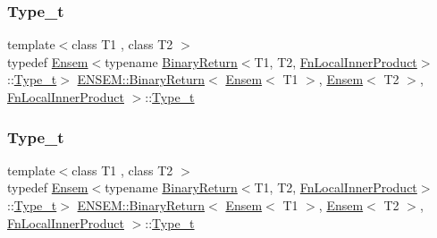 \subsubsection{\texorpdfstring{Type\_t}{Type\_t}\hspace{0.1cm}{\footnotesize\ttfamily [2/3]}}
{\footnotesize\ttfamily template$<$class T1 , class T2 $>$ \\
typedef \mbox{\hyperlink{classENSEM_1_1Ensem}{Ensem}}$<$typename \mbox{\hyperlink{structENSEM_1_1BinaryReturn}{Binary\+Return}}$<$T1, T2, \mbox{\hyperlink{structENSEM_1_1FnLocalInnerProduct}{Fn\+Local\+Inner\+Product}}$>$\+::\mbox{\hyperlink{structENSEM_1_1BinaryReturn_3_01Ensem_3_01T1_01_4_00_01Ensem_3_01T2_01_4_00_01FnLocalInnerProduct_01_4_acc62c13dfe7fd3c6776412ba9f1c3a3f}{Type\+\_\+t}}$>$ \mbox{\hyperlink{structENSEM_1_1BinaryReturn}{E\+N\+S\+E\+M\+::\+Binary\+Return}}$<$ \mbox{\hyperlink{classENSEM_1_1Ensem}{Ensem}}$<$ T1 $>$, \mbox{\hyperlink{classENSEM_1_1Ensem}{Ensem}}$<$ T2 $>$, \mbox{\hyperlink{structENSEM_1_1FnLocalInnerProduct}{Fn\+Local\+Inner\+Product}} $>$\+::\mbox{\hyperlink{structENSEM_1_1BinaryReturn_3_01Ensem_3_01T1_01_4_00_01Ensem_3_01T2_01_4_00_01FnLocalInnerProduct_01_4_acc62c13dfe7fd3c6776412ba9f1c3a3f}{Type\+\_\+t}}}

\mbox{\label{structENSEM_1_1BinaryReturn_3_01Ensem_3_01T1_01_4_00_01Ensem_3_01T2_01_4_00_01FnLocalInnerProduct_01_4_acc62c13dfe7fd3c6776412ba9f1c3a3f}} 
\subsubsection{\texorpdfstring{Type\_t}{Type\_t}\hspace{0.1cm}{\footnotesize\ttfamily [3/3]}}
{\footnotesize\ttfamily template$<$class T1 , class T2 $>$ \\
typedef \mbox{\hyperlink{classENSEM_1_1Ensem}{Ensem}}$<$typename \mbox{\hyperlink{structENSEM_1_1BinaryReturn}{Binary\+Return}}$<$T1, T2, \mbox{\hyperlink{structENSEM_1_1FnLocalInnerProduct}{Fn\+Local\+Inner\+Product}}$>$\+::\mbox{\hyperlink{structENSEM_1_1BinaryReturn_3_01Ensem_3_01T1_01_4_00_01Ensem_3_01T2_01_4_00_01FnLocalInnerProduct_01_4_acc62c13dfe7fd3c6776412ba9f1c3a3f}{Type\+\_\+t}}$>$ \mbox{\hyperlink{structENSEM_1_1BinaryReturn}{E\+N\+S\+E\+M\+::\+Binary\+Return}}$<$ \mbox{\hyperlink{classENSEM_1_1Ensem}{Ensem}}$<$ T1 $>$, \mbox{\hyperlink{classENSEM_1_1Ensem}{Ensem}}$<$ T2 $>$, \mbox{\hyperlink{structENSEM_1_1FnLocalInnerProduct}{Fn\+Local\+Inner\+Product}} $>$\+::\mbox{\hyperlink{structENSEM_1_1BinaryReturn_3_01Ensem_3_01T1_01_4_00_01Ensem_3_01T2_01_4_00_01FnLocalInnerProduct_01_4_acc62c13dfe7fd3c6776412ba9f1c3a3f}{Type\+\_\+t}}}



